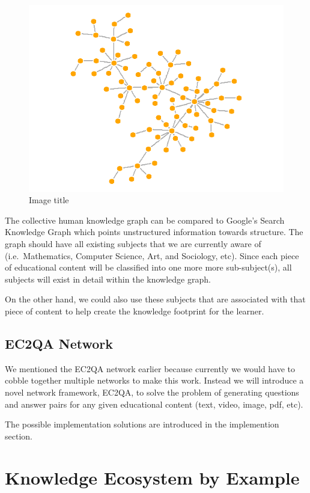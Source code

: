 \documentclass[]{book}
\theoremstyle{definition}
\theoremstyle{definition}
\theoremstyle{definition}
\theoremstyle{remark}
\begin{document}
\begin{figure}
\centering
\includegraphics{img/knowledge_graphy.png}
\caption{Image title}
\end{figure}

The collective human knowledge graph can be compared to Google's Search
Knowledge Graph \citep{googlekg} which points unstructured information
towards structure. The graph should have all existing subjects that we
are currently aware of (i.e.~Mathematics, Computer Science, Art, and
Sociology, etc). Since each piece of educational content will be
classified into one more more sub-subject(s), all subjects will exist in
detail within the knowledge graph.

On the other hand, we could also use these subjects that are associated
with that piece of content to help create the knowledge footprint for
the learner.

\subsection{EC2QA Network}\label{ec2qa-network}

We mentioned the EC2QA network earlier because currently we would have
to cobble together multiple networks to make this work. Instead we will
introduce a novel network framework, EC2QA, to solve the problem of
generating questions and answer pairs for any given educational content
(text, video, image, pdf, etc).

The possible implementation solutions are introduced in the implemention
section.

\section{Knowledge Ecosystem by
Example}\label{knowledge-ecosystem-by-example}
\end{document}

